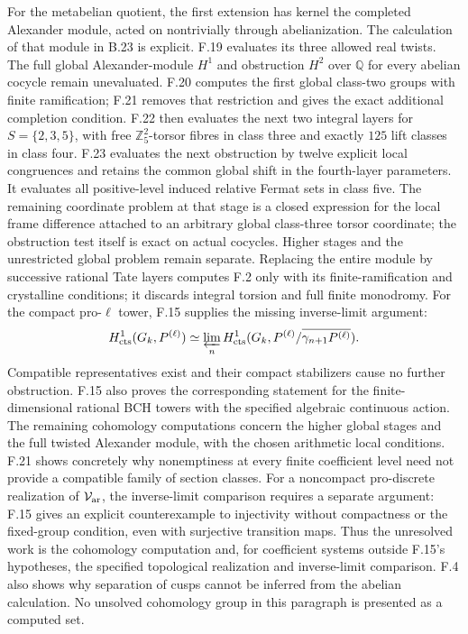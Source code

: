 For the metabelian quotient, the first extension has
kernel the completed Alexander module, acted on
nontrivially through abelianization. The calculation of
that module in B.23 is explicit. F.19 evaluates its
three allowed real twists. The full global
Alexander-module $H^1$ and obstruction $H^2$ over
$\mathbb Q$ for every abelian cocycle remain unevaluated.
F.20 computes the first global class-two groups with
finite ramification; F.21 removes that restriction and
gives the exact additional completion condition.
F.22 then evaluates the next two integral layers for
\(S=\{2,3,5\}\), with free \(\mathbb Z_5^2\)-torsor
fibres in class three and exactly \(125\) lift classes
in class four. F.23 evaluates the next obstruction
by twelve explicit local congruences and retains the
common global shift in the fourth-layer parameters.
It evaluates all positive-level induced relative
Fermat sets in class five. The remaining coordinate
problem at that stage is a closed expression for the
local frame difference attached to an arbitrary
global class-three torsor coordinate; the obstruction
test itself is exact on actual cocycles. Higher stages
and the unrestricted global problem remain separate.
Replacing the entire module by successive
rational Tate layers computes F.2 only with its
finite-ramification and crystalline conditions; it
discards integral torsion and full finite monodromy.
For the compact pro-$\ell$ tower, F.15 supplies the missing
inverse-limit argument:
\[
 H^1_{\rm cts}(G_k,P^{(\ell)})
 \simeq\varprojlim_n H^1_{\rm cts}
       (G_k,P^{(\ell)}/\overline{\gamma_{n+1}P^{(\ell)}}).
\]
Compatible representatives exist and their compact stabilizers
cause no further obstruction. F.15 also proves the corresponding
statement for the finite-dimensional rational BCH towers with
the specified algebraic continuous action. The remaining
cohomology computations concern the higher global stages
and the full twisted Alexander module, with the chosen
arithmetic local conditions. F.21 shows concretely why
nonemptiness at every finite coefficient level need not
provide a compatible family of section classes.
For a noncompact pro-discrete
realization of $\mathcal V_{\rm ar}$, the inverse-limit comparison
requires a separate argument: F.15 gives an explicit counterexample
to injectivity without compactness or the fixed-group condition,
even with surjective transition maps.
Thus the unresolved work is the cohomology computation and,
for coefficient systems outside F.15's hypotheses, the specified
topological realization and inverse-limit comparison.
F.4 also shows why separation
of cusps cannot be inferred from the abelian calculation.
No unsolved cohomology group in this paragraph is
presented as a computed set.

